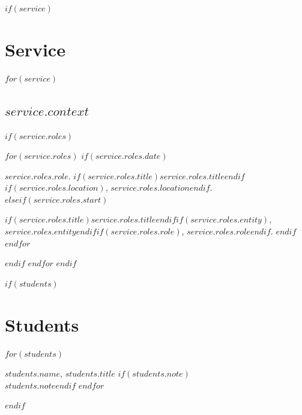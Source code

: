 \documentclass[11pt]{article}
\begin{document}
$if(service)$
\section{Service}
$for(service)$
\subsection*{$service.context$}
$if(service.roles)$
\ifstrequal{$service.context$}{Grant Reviews}{
\begin{cvlist}
$for(service.roles)$
\item $service.roles.role$
$endfor$
\end{cvlist}
}{
\ifstrequal{$service.context$}{Journal Reviewer}{
\begin{cvlist}
$for(service.roles)$
\item $service.roles.role$
$endfor$
\end{cvlist}
}{
\ifstrequal{$service.context$}{Consultancy}{
\begin{cvdesc}
$for(service.roles)$
\item[$service.roles.start$$if(service.roles.end)$--$service.roles.end$$endif$] $service.roles.role$
$endfor$
\end{cvdesc}
}{
\begin{cvdesc}
$for(service.roles)$
$if(service.roles.date)$
\item[$service.roles.date$] $service.roles.role$. $if(service.roles.title)$$service.roles.title$$endif$$if(service.roles.location)$, $service.roles.location$$endif$.
$elseif(service.roles.start)$
\item[$service.roles.start$$if(service.roles.end)$--$service.roles.end$$endif$] $if(service.roles.title)$$service.roles.title$$endif$$if(service.roles.entity)$, $service.roles.entity$$endif$$if(service.roles.role)$, $service.roles.role$$endif$.
$endif$
$endfor$
\end{cvdesc}
}
}
}
$endif$
$endfor$
$endif$

$if(students)$
\section{Students}
\begin{cvdesc}
$for(students)$
\item[$students.start$--$students.end$] $students.name$, \emph{$students.title$}
$if(students.note)$\\ $students.note$$endif$
$endfor$
\end{cvdesc}
$endif$
\end{document}
